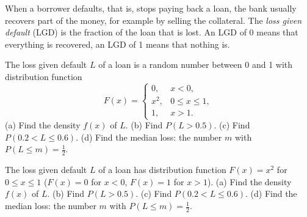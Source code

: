 
\begin{problem}
	\begin{context}
		When a borrower defaults, that is, stops paying back a loan, the bank
		usually recovers part of the money, for example by selling the
		collateral. The \emph{loss given default} (LGD) is the fraction of the
		loan that is lost. An LGD of 0 means that everything is recovered, an
		LGD of 1 means that nothing is.
	\end{context}
	The loss given default $L$ of a loan is a random number between 0 and 1
	with distribution function
	\[ F(x)=\begin{cases}
			0,   & x<0,          \\
			x^2, & 0\le x\le 1,  \\
			1,   & x>1.
		\end{cases} \]
	(a) Find the density $f(x)$ of $L$.
	(b) Find $P(L>0.5)$.
	(c) Find $P(0.2<L\le0.6)$.
	(d) Find the median loss: the number $m$ with $P(L\le m)=\frac12$.
\end{problem}

\begin{slideproblem}
	The loss given default $L$ of a loan has distribution function
	$F(x)=x^2$ for $0\le x\le1$ ($F(x)=0$ for $x<0$, $F(x)=1$ for $x>1$).
	(a) Find the density $f(x)$ of $L$.
	(b) Find $P(L>0.5)$.
	(c) Find $P(0.2<L\le0.6)$.
	(d) Find the median loss: the number $m$ with $P(L\le m)=\frac12$.
\end{slideproblem}

